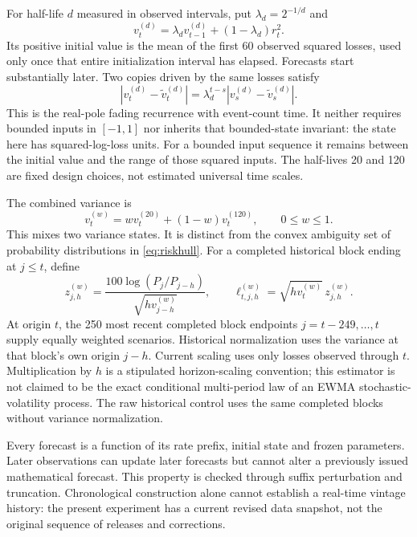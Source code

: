 \documentclass[11pt,a4paper]{article}
\theoremstyle{definition}\newtheorem{definition}[theorem]{Definition}
\begin{document}
For half-life $d$ measured in observed intervals, put $\lambda_d=2^{-1/d}$ and
\begin{equation}
 v^{(d)}_t=\lambda_dv^{(d)}_{t-1}+(1-\lambda_d)r_t^2.
 \label{eq:fxvariance}
\end{equation}
Its positive initial value is the mean of the first 60 observed squared losses, used only once that entire initialization interval has elapsed. Forecasts start substantially later. Two copies driven by the same losses satisfy
\[
 |v^{(d)}_t-\widetilde v^{(d)}_t|=\lambda_d^{t-s}|v^{(d)}_s-\widetilde v^{(d)}_s|.
\]
This is the real-pole fading recurrence with event-count time. It neither requires bounded inputs in $[-1,1]$ nor inherits that bounded-state invariant: the state here has squared-log-loss units. For a bounded input sequence it remains between the initial value and the range of those squared inputs. The half-lives 20 and 120 are fixed design choices, not estimated universal time scales.

The combined variance is
\begin{equation}
 v^{(w)}_t=w v^{(20)}_t+(1-w)v^{(120)}_t,\qquad 0\le w\le1.
 \label{eq:fxmixture}
\end{equation}
This mixes two variance states. It is distinct from the convex ambiguity set of probability distributions in \eqref{eq:riskhull}. For a completed historical block ending at $j\le t$, define
\begin{equation}
 z^{(w)}_{j,h}=\frac{100\log(P_j/P_{j-h})}{\sqrt{h v^{(w)}_{j-h}}},\qquad
 \ell^{(w)}_{t,j,h}=\sqrt{h v^{(w)}_t}\,z^{(w)}_{j,h}.
 \label{eq:filteredscenarios}
\end{equation}
At origin $t$, the 250 most recent completed block endpoints $j=t-249,\ldots,t$ supply equally weighted scenarios. Historical normalization uses the variance at that block's own origin $j-h$. Current scaling uses only losses observed through $t$. Multiplication by $h$ is a stipulated horizon-scaling convention; this estimator is not claimed to be the exact conditional multi-period law of an EWMA stochastic-volatility process. The raw historical control uses the same completed blocks without variance normalization.

Every forecast is a function of its rate prefix, initial state and frozen parameters. Later observations can update later forecasts but cannot alter a previously issued mathematical forecast. This property is checked through suffix perturbation and truncation. Chronological construction alone cannot establish a real-time vintage history: the present experiment has a current revised data snapshot, not the original sequence of releases and corrections.
\end{document}
